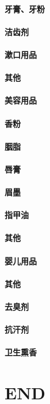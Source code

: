 \documentclass[UTF8]{../../ApplicationUniverse}
\begin{document}
        \subsubsection{牙膏、牙粉}
        \subsubsection{洁齿剂}
        \subsubsection{漱口用品}
        \subsubsection{其他}
    \subsubsection{美容用品}
        \subsubsection{香粉}
        \subsubsection{胭脂}
        \subsubsection{唇膏}
        \subsubsection{眉墨}
        \subsubsection{指甲油}
        \subsubsection{其他}
    \subsubsection{婴儿用品}
    \subsubsection{其他}
        \subsubsection{去臭剂}
        \subsubsection{抗汗剂}
        \subsubsection{卫生熏香}





\chapter{END}
\end{document}
